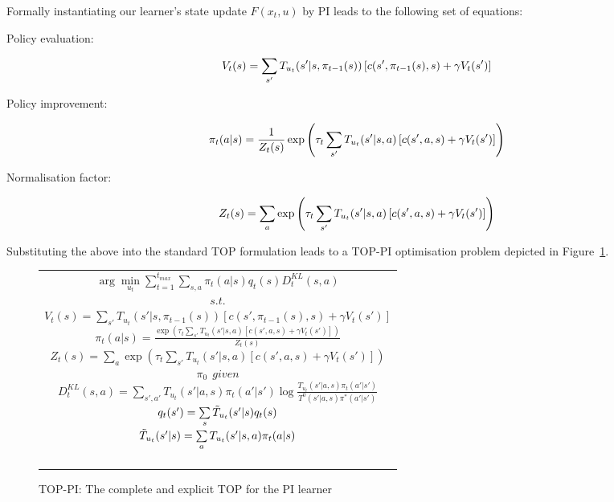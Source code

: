 Formally instantiating our learner's state update $F(x_t,u)$ by PI
leads to the following set of equations: %
\begin{description}
\item[Policy evaluation:]
\[\hspace{-20pt}V_t(s)=\sum\limits_{s'}T_{u_t}(s'|s,\pi_{t-1}(s))\left[
    c(s',\pi_{t-1}(s),s)+\gamma V_t(s')
    \right]\]

\item[Policy improvement:]
\[\hspace{-20pt}\pi_t(a|s)=\frac{1}{Z_t(s)}\exp\left(\tau_t\sum\limits_{s'}T_{u_t}(s'|s,a)\left[
    c(s',a,s)+\gamma V_t(s')
    \right]\right) \]
    
\item[Normalisation factor:]
\[\hspace{-20pt}Z_t(s)=\sum\limits_a\exp\left(\tau_t\sum\limits_{s'}T_{u_t}(s'|s,a)\left[
    c(s',a,s)+\gamma V_t(s') \right]\right)\]
\end{description}
    

Substituting the above into the standard
TOP formulation leads to a TOP-PI optimisation problem depicted in
Figure~\ref{t_opt_PI}.
\begin{figure}[th]
\begin{tabular}{|c|} \hline \parbox{3.2 in} {\center 
$\arg\min\limits_{u_t}\sum\limits_{t=1}^{t_{max}}\sum\limits_{s,a}\pi_t(a|s)q_t(s)D^{KL}_t(s,a)$\\
$s.t.$\\
$V_t(s)=\sum\limits_{s'}T_{u_t}(s'|s,\pi_{t-1}(s))\left[
c(s',\pi_{t-1}(s),s)+\gamma V_t(s')
\right]$\\
$\pi_t(a|s)=\frac{\exp\left(\tau_t\sum\limits_{s'}T_{u_t}(s'|s,a)\left[
c(s',a,s)+\gamma V_t(s')
\right]\right)}{Z_t(s)}$\\
$Z_t(s)=\sum\limits_a\exp\left(\tau_t\sum\limits_{s'}T_{u_t}(s'|s,a)\left[
c(s',a,s)+\gamma V_t(s')
\right]\right)$\\
$\pi_0\ \ \displaystyle{given}$\\
$D^{KL}_t(s,a)=\sum\limits_{s',a'}T_{u_t}(s'|a,s)\pi_t(a'|s')\log\frac{T_{u_t}(s'|a,s)\pi_t(a'|s')}{T^0(s'|a,s)\pi^*(a'|s')}$\\
$q_t(s')=\sum\limits_s\Tilde{T}_{u_t}(s'|s)q_t(s)$\\
$\Tilde{T}_{u_t}(s'|s)=\sum\limits_aT_{u_t}(s'|s,a)\pi_t(a|s)$\\\ \\
}\\ \hline \end{tabular}
\caption{\label{t_opt_PI}TOP-PI: The complete and explicit TOP for the
  PI learner}
\end{figure}
